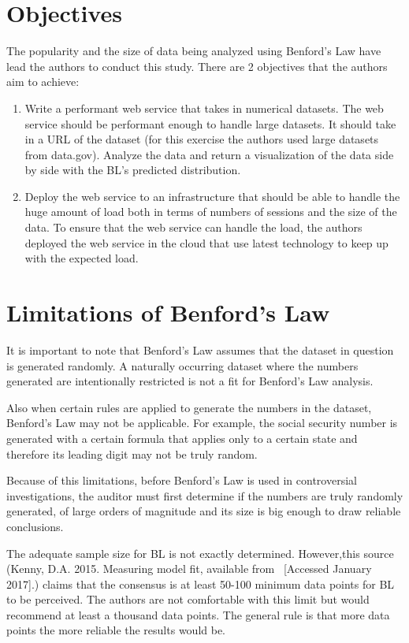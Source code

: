 \section{Objectives}
The popularity and the size of data being 
analyzed using Benford’s Law have lead the authors 
to conduct this study. 
There are 2 objectives that the authors aim to achieve:

\begin{enumerate}
\item
Write a performant web service that takes in numerical datasets. 
The web service should be performant enough to handle large datasets. 
It should take in a URL of the dataset (for this exercise the authors used
large datasets from data.gov). Analyze the data and return a visualization 
of the data side by side with the BL’s predicted distribution.
\item
Deploy the web service to an infrastructure that should be able to handle 
the huge amount of load both in terms of numbers of sessions and the size 
of the data. To ensure that the web service can handle the load, 
the authors deployed the web service in the cloud that use latest 
technology to keep up with the expected load.
\end{enumerate}

\section{Limitations of Benford’s Law}
It is important to note that Benford’s Law assumes that the 
dataset in question is generated randomly. A naturally occurring 
dataset where the numbers generated are intentionally restricted 
is not a fit for Benford’s Law analysis. 

Also when certain rules are applied to generate 
the numbers in the dataset, Benford’s Law may not be applicable.
For example, the social security number is generated with a 
certain formula that applies only to a certain state 
and therefore its leading digit may not be truly random. 

Because of this limitations, before Benford’s Law is
used in controversial investigations, the auditor must 
first determine if the numbers are truly randomly generated, 
of large orders of magnitude and its size is big enough 
to draw reliable conclusions.

The adequate sample size for BL is not exactly 
determined. However,this source 
(Kenny, D.A. 2015. Measuring model fit, 
available from~\cite{hid-sp18-514-Kenny-Measuring-model}
[Accessed January 2017].)  
claims that the consensus is at least 50-100 minimum data 
points for BL to be perceived. The authors are not 
comfortable with this limit but would recommend at least 
a thousand data points. The general rule is that more 
data points the more reliable the results would be.

